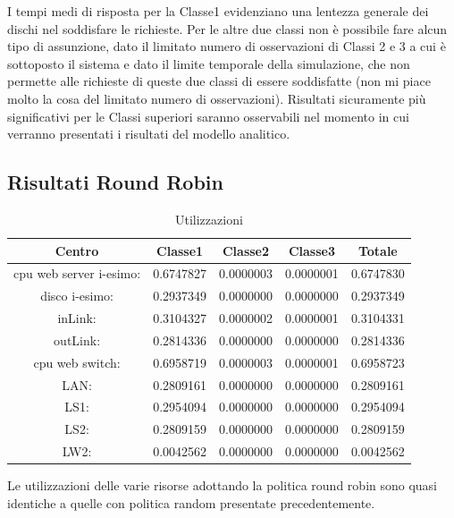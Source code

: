 I tempi medi di risposta per la Classe1 evidenziano una lentezza generale dei dischi nel soddisfare le richieste. Per le altre due classi non è possibile fare alcun tipo di assunzione, dato il limitato numero di osservazioni di Classi 2 e 3 a cui è sottoposto il sistema e dato il limite temporale della simulazione, che non permette alle richieste di queste due classi di essere soddisfatte (non mi piace molto la cosa del limitato numero di osservazioni). Risultati sicuramente più significativi per le Classi superiori saranno osservabili nel momento in cui verranno presentati i risultati del modello analitico.

\subsection{Risultati Round Robin}
\begin{table}[htbp]
\begin{center}
\begin{tabular}{|c|c|c|c|c|}
\hline
Centro &Classe1 &Classe2 &Classe3 &Totale\\
\hline
\hline
 cpu web server i-esimo: 	&0.6747827	&0.0000003	&0.0000001	&0.6747830\\
\hline
 disco i-esimo: 	&0.2937349	&0.0000000	&0.0000000	&0.2937349\\
\hline
 inLink: 	&0.3104327	&0.0000002	&0.0000001	&0.3104331\\
\hline
 outLink: 	&0.2814336	&0.0000000	&0.0000000	&0.2814336\\
\hline
 cpu web switch: 	&0.6958719	&0.0000003	&0.0000001	&0.6958723\\
\hline
 LAN: 	&0.2809161	&0.0000000	&0.0000000	&0.2809161\\
\hline
 LS1: 	&0.2954094	&0.0000000	&0.0000000	&0.2954094\\
\hline
 LS2:	&0.2809159	&0.0000000	&0.0000000	&0.2809159\\
\hline
 LW2: 	&0.0042562	&0.0000000	&0.0000000	&0.0042562\\
\hline
\end{tabular}
\end{center}
\caption{Utilizzazioni}
\label{utilizzazioni}
\end{table}
Le utilizzazioni delle varie risorse adottando la politica round robin sono quasi identiche a quelle con politica random presentate precedentemente.
